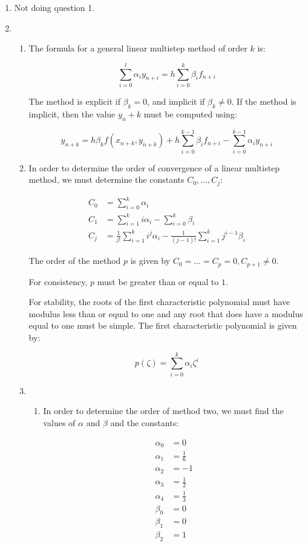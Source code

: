 \documentclass{report}
\begin{document}
\begin{enumerate}
\item Not doing question 1.
\item
  \begin{enumerate}
  \item The formula for a general linear multistep method of order $k$
  is:

  \[
    \sum\limits^l_{i=0}\alpha_iy_{n+i} = h\sum\limits^k_{i=0}\beta_if_{n+i}
  \]

  The method is explicit if $\beta_k = 0$, and implicit if $\beta_k
  \neq 0$. If the method is implicit, then the value $y_n+k$ must be
  computed using:

  \[
    y_{n+k} = h\beta_kf(x_{n+k},y_{n+k}) + h\sum\limits^{k -
      1}_{i=0}\beta_if_{n+i} - \sum\limits^{k-1}_{i=0}\alpha_iy_{n+i}
  \]
  \item In order to determine the order of convergence of a linear
    multistep method, we must determine the constants $C_0, \dots,
    C_j$:

    \[
      \begin{split}
        C_0 &= \sum\limits^k_{i=0}\alpha_i\\
        C_1 &= \sum\limits^k_{i=1}i\alpha_i - \sum\limits^k_{i=0}\beta_i\\
        C_j &= \frac{1}{j!}\sum\limits^k_{i=1}i^j\alpha_i - \frac{1}{(j-1)!}\sum\limits^k_{i=1}j^{i-1}\beta_i
      \end{split}
    \]

    The order of the method $p$ is given by $C_0 = ... = C_p = 0,
    C_{p+1} \neq 0$.

    For consistency, $p$ must be greater than or equal to $1$.

    For stability, the roots of the first characteristic polynomial
    must have modulus less than or equal to one and any root that does
    have a modulus equal to one must be simple. The first
    characteristic polynomial is given by:

    \[
      p(\zeta) = \sum\limits^k_{i=0}\alpha_i\zeta^i
    \]
  \item
    \begin{enumerate}
    \item In order to determine the order of method two, we must find
      the values of $\alpha$ and $\beta$ and the constants:

      \[
      \begin{split}
        \alpha_0 &= 0\\
        \alpha_1 &= \frac{1}{6}\\
        \alpha_2 &= -1\\
        \alpha_3 &= \frac{1}{2}\\
        \alpha_4 &= \frac{1}{3}\\
        \beta_0 &= 0\\
        \beta_1 &= 0\\
        \beta_2 &= 1
      \end{split}
      \]


\end{enumerate}
\end{enumerate}
\end{enumerate}
\end{document}
